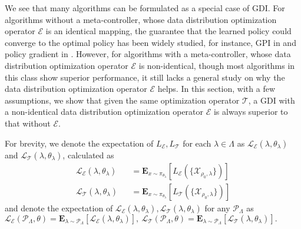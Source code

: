 \documentclass[nohyperref]{article}
\theoremstyle{plain}
\begin{document}
We see that many algorithms can be formulated as a special case of GDI.
For algorithms without a meta-controller, whose data distribution optimization operator $\mathcal{E}$ is an identical mapping, the guarantee that the learned policy could converge to the optimal policy has been widely studied, for instance, GPI in \citep{sutton} and policy gradient in \citep{pgtheory}.
However, for algorithms with a meta-controller, whose data distribution optimization operator $\mathcal{E}$ is non-identical, though most algorithms in this class show superior performance, it still lacks a general study on why the data distribution optimization operator $\mathcal{E}$ helps.
In this section, with a few assumptions, we show that given the same optimization operator $\mathcal{T}$, a GDI with a non-identical data distribution optimization operator $\mathcal{E}$ is always superior to that without $\mathcal{E}$.

For brevity, we denote the expectation of $L_\mathcal{E}, L_\mathcal{T}$ for each $\lambda \in \Lambda$ as $\mathcal{L}_{\mathcal{E}} (\lambda, \theta_\lambda) $ and $\mathcal{L}_{\mathcal{T}} (\lambda, \theta_\lambda)$, calculated as
\begin{equation*}
\begin{aligned}
        \mathcal{L}_{\mathcal{E}} (\lambda, \theta_\lambda) 
    && = \textbf{E}_{x \sim \pi_{\theta_\lambda}} [L_{\mathcal{E}} (\{\mathcal{X}_{\rho_0, \lambda}\})]\\ 
    \mathcal{L}_{\mathcal{T}} (\lambda, \theta_\lambda) 
    && = \textbf{E}_{x \sim \pi_{\theta_\lambda}} [L_{\mathcal{T}} (\{\mathcal{X}_{\rho_0, \lambda}\})]
\end{aligned}
\end{equation*}
and denote the expectation of $\mathcal{L}_\mathcal{E}(\lambda, \theta_\lambda), \mathcal{L}_\mathcal{T}(\lambda, \theta_\lambda)$ for any $\mathcal{P}_{\Lambda}$ as 
    $\mathcal{L}_{\mathcal{E}} (\mathcal{P}_{\Lambda}, \theta) 
    = \textbf{E}_{\lambda \sim \mathcal{P}_{\Lambda}} [\mathcal{L}_{\mathcal{E}} (\lambda, \theta_\lambda) ], \ 
    \mathcal{L}_{\mathcal{T}} (\mathcal{P}_{\Lambda}, \theta) 
    = \textbf{E}_{\lambda \sim \mathcal{P}_{\Lambda}}  [\mathcal{L}_{\mathcal{T}} (\lambda, \theta_\lambda)].$
\end{document}
